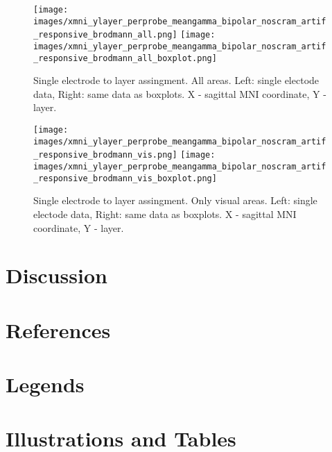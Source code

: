 \documentclass[final]{jneurosci}
\begin{document}
\begin{figure}
\centering
\texttt{[image: images/xmni\_ylayer\_perprobe\_meangamma\_bipolar\_noscram\_artif\_responsive\_brodmann\_all.png]}
\texttt{[image: images/xmni\_ylayer\_perprobe\_meangamma\_bipolar\_noscram\_artif\_responsive\_brodmann\_all\_boxplot.png]}
\caption{Single electrode to layer assingment. All areas. Left: single electode data, Right: same data as boxplots. X - sagittal MNI coordinate, Y - layer.}
\label{fig:single_plots_layer_allareas}
\end{figure}

\begin{figure}
\centering
\texttt{[image: images/xmni\_ylayer\_perprobe\_meangamma\_bipolar\_noscram\_artif\_responsive\_brodmann\_vis.png]}
\texttt{[image: images/xmni\_ylayer\_perprobe\_meangamma\_bipolar\_noscram\_artif\_responsive\_brodmann\_vis\_boxplot.png]}
\caption{Single electrode to layer assingment. Only visual areas. Left: single electode data, Right: same data as boxplots. X - sagittal MNI coordinate, Y - layer.} 
\label{fig:single_plots_layer_visareas}
\end{figure}

%
%
\section{Discussion}


%
%
\section{References}




%
%
\section{Legends}


%
%
\section{Illustrations and Tables}
\end{document}
